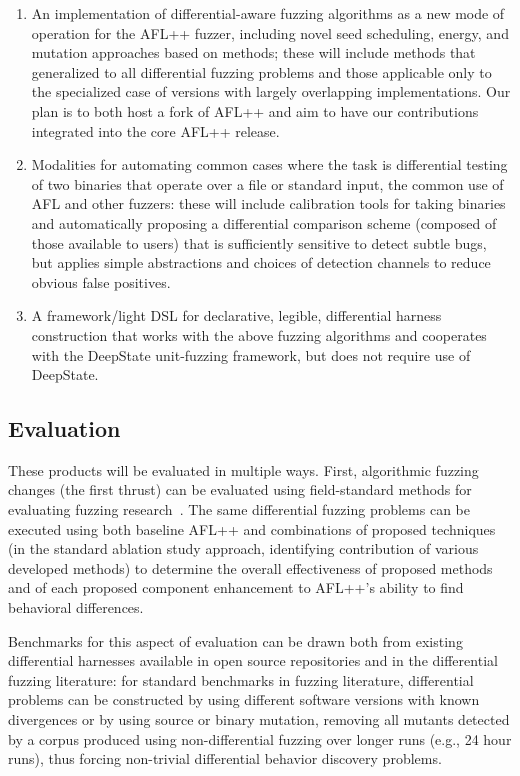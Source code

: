 \begin{enumerate}
\item An implementation of differential-aware fuzzing algorithms as a
  new mode of operation for the AFL++ fuzzer, including novel
  seed scheduling, energy, and mutation approaches based on
  methods; these will include methods that generalized to all
  differential fuzzing problems and those applicable only
  to the specialized case of versions with largely overlapping
  implementations.  Our plan is to both host a fork of AFL++ and aim
  to have our contributions integrated into the core AFL++ release.  
  \item Modalities for automating common cases where the task is
    differential testing of two binaries that operate over a
   file or standard input, the common use of AFL and other fuzzers:
   these will include calibration tools for taking binaries and
   automatically proposing a differential comparison scheme (composed
   of those available to users) that is sufficiently sensitive to
   detect subtle bugs, but applies simple abstractions and choices of
   detection channels to reduce obvious false positives.
\item A framework/light DSL for declarative, legible, differential harness
  construction that works with the above fuzzing algorithms and cooperates
  with the DeepState unit-fuzzing framework, but does not require use
  of DeepState.
\end{enumerate}

\subsection{Evaluation}

These products will be evaluated in multiple ways.  First, algorithmic
fuzzing changes (the first thrust) can be evaluated using field-standard methods for
evaluating fuzzing research~\cite{FuzzerHicks}.  The same differential
fuzzing problems can be executed using both baseline AFL++ and
combinations of proposed techniques (in the standard ablation study
approach, identifying contribution of various developed methods) to determine the overall effectiveness of proposed methods
and of each proposed component enhancement to AFL++'s ability to find
behavioral differences.

Benchmarks for this aspect of
evaluation can be drawn both from existing differential harnesses
available in open source repositories and in the differential fuzzing
literature: for standard benchmarks in fuzzing literature,
differential problems can be constructed by using different software
versions with known divergences or by using source or binary mutation,
removing all mutants detected by a corpus produced using
non-differential fuzzing over longer runs (e.g., 24 hour runs), thus forcing
non-trivial differential behavior discovery problems.

